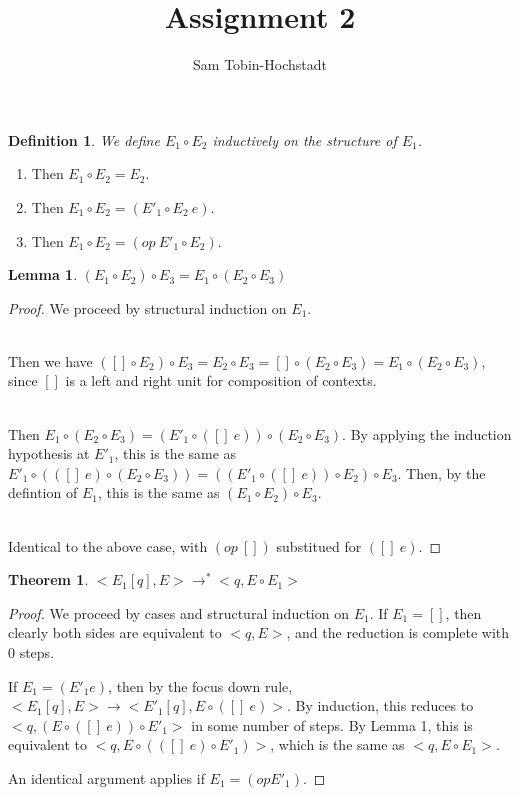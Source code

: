\documentclass{amsart}
\newtheorem{theorem}{Theorem}
\newtheorem{lemma}{Lemma}
\newtheorem{define}{Definition}
\newcommand{\proofcase}[1]{\item[Case {\textsc {#1}}:]}
\begin{document}
\title{Assignment 2}
\author{Sam Tobin-Hochstadt}

\maketitle

\begin{define}
We define $E_1 \circ E_2$ inductively on the structure of $E_1$.
\end{define}

\begin{enumerate}
\proofcase{$E_1 = []$} Then $E_1 \circ E_2 = E_2$.  \vspace{2mm}

\proofcase{$E_1 = (E'_1\ e)$} Then $E_1 \circ E_2 = (E'_1 \circ E_2\
e)$. \vspace{2mm}

\proofcase{$E_1 = (op\ E'_1)$} Then $E_1 \circ E_2 = (op\ E'_1 \circ
E_2)$. \vspace{2mm}

\end{enumerate}

\begin{lemma}
$(E_1 \circ E_2) \circ E_3 = E_1 \circ (E_2 \circ E_3)$
\end{lemma}

\begin{proof}
We proceed by structural induction on $E_1$.

\proofcase{$E_1 = []$} \ \\
Then we have $([] \circ E_2) \circ E_3 = E_2 \circ E_3 = [] \circ (E_2
\circ E_3) = E_1 \circ (E_2 \circ E_3)$, since $[]$ is a left and
right unit for composition of contexts.
\proofcase{$E_1 = E'_1 \circ ([]\ e)$}\ \\
Then $ E_1 \circ (E_2 \circ E_3) = (E'_1 \circ ([]\ e)) \circ (E_2
\circ E_3)$. By applying the induction hypothesis at $E'_1$, this is
the same as $E'_1 \circ (([]\ e) \circ (E_2 \circ E_3)) = ((E'_1 \circ
([]\ e)) \circ E_2) \circ E_3$.  Then, by the defintion of $E_1$, this
is the same as $(E_1 \circ E_2) \circ E_3$.  


\proofcase{$E_1 = E'_1 \circ (op\ [])$}\ \\ Identical to the
above case, with $(op\ [])$ substitued for $([]\ e)$.
\end{proof}

\begin{theorem}
  $<E_1[q], E> \rightarrow^* <q,E \circ E_1>$
\end{theorem}

\begin{proof}
  We proceed by cases and structural induction on $E_1$.  If $E_1 =
  []$, then clearly both sides are equivalent to $<q,E>$, and the
  reduction is complete with 0 steps.  

  If $E_1 = (E'_1 e)$, then by the focus down rule, $<E_1[q], E>
  \rightarrow <E'_1[q], E \circ ([]\ e)>$. By induction, this reduces
  to $<q,(E \circ ([]\ e)) \circ E'_1>$ in some number of steps.  By
  Lemma 1, this is equivalent to $<q,E \circ (([]\ e) \circ E'_1)>$,
  which is the same as $<q,E \circ E_1>$.

  An identical argument applies if $E_1 = (op E'_1)$.
\end{proof}
\end{document}
